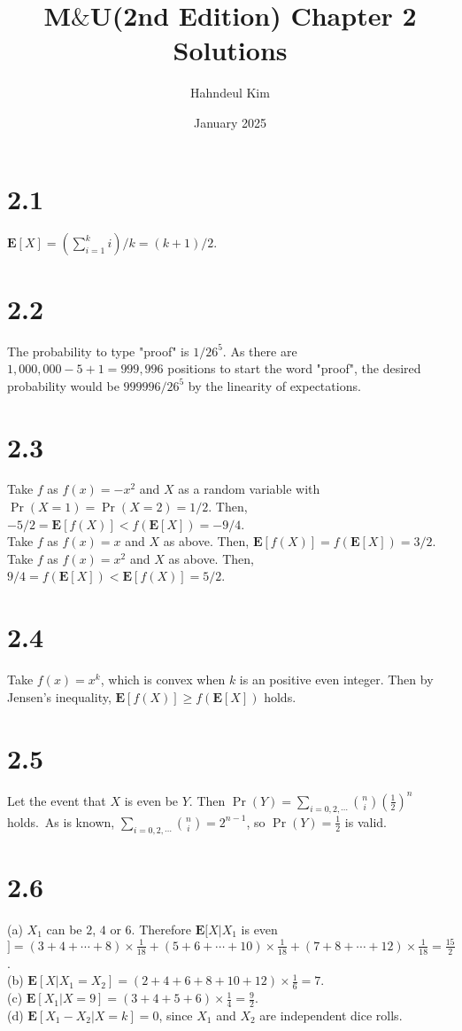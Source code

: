 \documentclass{article}
\title{M$\&$U(2nd Edition) Chapter 2 Solutions}
\author{Hahndeul Kim}
\date{January 2025}
\begin{document}
\maketitle
\newpage
\section*{2.1}
$\textbf{E}[X]=\left(\sum\limits_{i=1}^ki\right)/k=(k+1)/2$.
\section*{2.2}
The probability to type "proof" is $1/26^5$. As there are $1,000,000-5+1=999,996$ positions to start the word "proof", the desired probability would be $999996/26^5$ by the linearity of expectations.
\section*{2.3}
Take $f$ as $f(x)=-x^2$ and $X$ as a random variable with $\Pr(X=1)=\Pr(X=2)=1/2$. Then, $-5/2=\textbf{E}[f(X)]<f(\textbf{E}[X])=-9/4$.\\
Take $f$ as $f(x)=x$ and $X$ as above. Then, $\textbf{E}[f(X)]=f(\textbf{E}[X])=3/2$.\\
Take $f$ as $f(x)=x^2$ and $X$ as above. Then, $9/4=f(\textbf{E}[X])<\textbf{E}[f(X)]=5/2$.
\section*{2.4}
Take $f(x)=x^k$, which is convex when $k$ is an positive even integer.
Then by Jensen's inequality, $\textbf{E}[f(X)] \geq f(\textbf{E}[X])$ holds.
\section*{2.5}
Let the event that $X$ is even be $Y$. Then $\Pr(Y)=\sum\limits_{i=0,2,\cdots}\binom{n}{i}(\frac{1}{2})^n$ holds.\
As is known, $\sum\limits_{i=0,2,\cdots}\binom{n}{i}=2^{n-1}$, so $\Pr(Y)={\frac{1}{2}}$ is valid.
\section*{2.6}
(a) $X_1$ can be $2$, $4$ or $6$. Therefore $\textbf{E}[X|X_1$ is even$] = (3+4+\cdots+8)\times \frac{1}{18}+(5+6+\cdots+10)\times \frac{1}{18}+(7+8+\cdots+12)\times \frac{1}{18}=\frac{15}{2}$.\\
(b) $\textbf{E}[X|X_1 = X_2]=(2+4+6+8+10+12)\times\frac{1}{6}=7$.\\
(c) $\textbf{E}[X_1|X=9]=(3+4+5+6)\times\frac{1}{4}=\frac{9}{2}$.\\
(d) $\textbf{E}[X_1 - X_2|X=k]=0$, since $X_1$ and $X_2$ are independent dice rolls.
\end{document}
